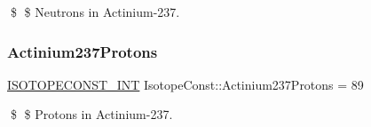 \$ \$ Neutrons in Actinium-\/237. \mbox{\label{group___isotope_const-_actinium-_ac237_ga7690b529e765c47811ba0a257a4f3b56}} 
\subsubsection{\texorpdfstring{Actinium237\+Protons}{Actinium237Protons}}
{\footnotesize\ttfamily \mbox{\hyperlink{group___isotope_const-_macros_ga5f18360b3e99483a35c32d789e62621c}{I\+S\+O\+T\+O\+P\+E\+C\+O\+N\+S\+T\+\_\+\+I\+NT}} Isotope\+Const\+::\+Actinium237\+Protons = 89}

\$ \$ Protons in Actinium-\/237. 